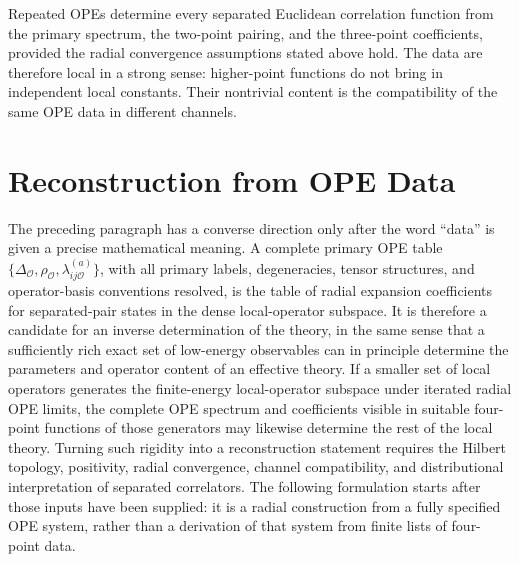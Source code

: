 Repeated OPEs determine every separated Euclidean correlation function from
the primary spectrum, the two-point pairing, and the three-point
coefficients, provided the radial convergence assumptions stated above hold.
The data are therefore local in a strong sense: higher-point functions do not
bring in independent local constants.  Their nontrivial content is the
compatibility of the same OPE data in different channels.

\section{Reconstruction from OPE Data}
\label{sec:cft-reconstruction-from-ope-data}

The preceding paragraph has a converse direction only after the word
``data'' is given a precise mathematical meaning.  A complete primary OPE
table
\(\{\Delta_{\mathcal O},\rho_{\mathcal O},\lambda_{ij\mathcal O}^{(a)}\}\),
with all primary labels, degeneracies, tensor structures, and operator-basis
conventions resolved, is the table of radial expansion coefficients for
separated-pair states in the dense local-operator subspace.  It is therefore
a candidate for an inverse determination of the theory, in the same sense
that a sufficiently rich exact set of low-energy observables can in principle
determine the parameters and operator content of an effective theory.  If a
smaller set of local operators generates the finite-energy local-operator
subspace under iterated radial OPE limits, the complete OPE spectrum and
coefficients visible in suitable four-point functions of those generators may
likewise determine the rest of the local theory.  Turning such rigidity into
a reconstruction statement requires the Hilbert topology, positivity, radial
convergence, channel compatibility, and distributional interpretation of
separated correlators.  The following formulation starts after those inputs
have been supplied: it is a radial construction from a fully specified OPE
system, rather than a derivation of that system from finite lists of
four-point data.

